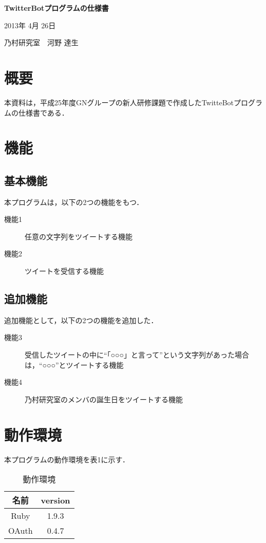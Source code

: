 \documentclass[fleqn, 14pt]{extarticlej}
\begin{document}
\begin{center}
{\Large {\bf TwitterBotプログラムの仕様書}}

\end{center}
\begin{flushright}
2013年 4月 26日

乃村研究室　河野 達生
\end{flushright}

\section{概要 }
本資料は，平成25年度GNグループの新人研修課題で作成したTwitteBotプログラムの仕様書である．


\section{機能}
\subsection{基本機能}
本プログラムは，以下の2つの機能をもつ．
\begin{description}
  \item[機能1] 任意の文字列をツイートする機能
  \item[機能2] ツイートを受信する機能
\end{description}

\subsection{追加機能}
追加機能として，以下の2つの機能を追加した．
\begin{description}
  \item[機能3] 受信したツイートの中に“「○○○」と言って”という文字列があった場合は，“○○○”とツイートする機能
  \item[機能4] 乃村研究室のメンバの誕生日をツイートする機能
\end{description}


\section{動作環境}
本プログラムの動作環境を表1に示す．
\begin{table}[h]
  \begin{center}
    \caption{動作環境}
    \begin{tabular}{c|c}\hline\hline
      名前  & version\\ \hline
      Ruby   &  1.9.3 \\ 
      OAuth &  0.4.7 \\ \hline
    \end{tabular} 
  \end{center}
\end{table}
\end{document}
